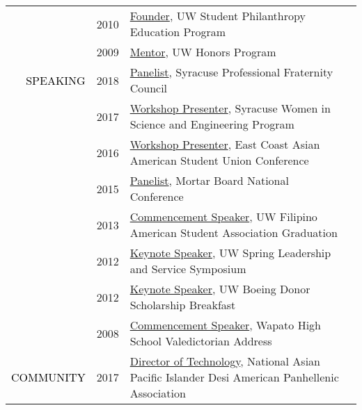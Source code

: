 \documentclass[12pt]{article}
\begin{document}
{{\begin{longtable}{Rp{1.0in}p{0.25in}p{4.75in}}
& \footnotesize{2010} & \href{https://www.washington.edu/giving/get-involved/for-students/real-dawgs-give-back/}{{Founder}}, UW Student Philanthropy Education Program \\

& \footnotesize{2009} & \href{http://depts.washington.edu/uwhonors/community/grads/12\_13/\#bdosono}{{Mentor}}, UW Honors Program \\

\textcolor{black}{\footnotesize{\uppercase{Speaking}}} & \footnotesize{2018} & \href{https://www.facebook.com/events/170505843576915/}{{Panelist}}, Syracuse Professional Fraternity Council \\

& \footnotesize{2017} & \href{http://www.suwise.syr.edu/}{{Workshop Presenter}}, Syracuse Women in Science and Engineering Program \\

& \footnotesize{2016} & \href{http://www.ecaasu.org/}{{Workshop Presenter}}, East Coast Asian American Student Union Conference \\

& \footnotesize{2015} & \href{http://www.mortarboard.org/conference/}{{Panelist}}, Mortar Board National Conference \\

& \footnotesize{2013} & \href{http://youtu.be/uz1tukrR-7E}{{Commencement Speaker}}, UW Filipino American Student Association Graduation \\

& \footnotesize{2012} & \href{https://youtu.be/WMPhe6H7yiM}{{Keynote Speaker}}, UW Spring Leadership and Service Symposium \\

& \footnotesize{2012} & \href{https://web.archive.org/web/20170801205151/https://ischool.uw.edu/news/2012/04/bryan-dosono-informatics-student-speaks-boeing-scholarship-breakfast}{{Keynote Speaker}}, UW Boeing Donor Scholarship Breakfast \\

& \footnotesize{2008} & \href{https://youtu.be/5gt7nFRgkac}{{Commencement Speaker}}, Wapato High School Valedictorian Address \\

\textcolor{black}{\footnotesize{\uppercase{Community}}} & \footnotesize{2017} & \href{http://napahq.org}{{Director of Technology}}, National Asian Pacific Islander Desi American Panhellenic Association \\


\end{longtable}}}
\end{document}
